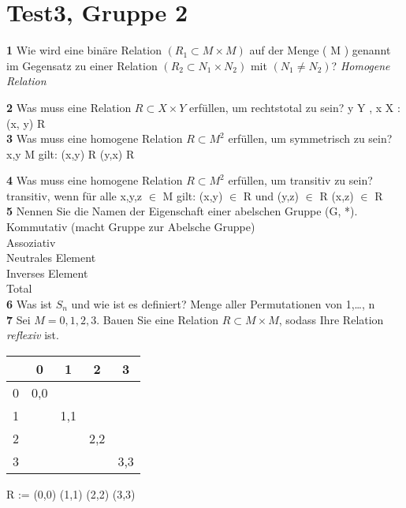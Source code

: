 \documentclass[11pt]{article}
\begin{document}
\section{Test3, Gruppe 2}
    \textbf{1} Wie wird eine binäre Relation $( R_1 \subset M \times M )$ auf der Menge ( M ) genannt im Gegensatz zu einer Relation $( R_2 \subset N_1 \times N_2 )$ mit $( N_1 \neq N_2 )$?\newline
    {\itshape Homogene Relation}\newline

    \textbf{2} Was muss eine Relation \( R \subset X \times Y \) erfüllen, um rechtstotal zu sein?\newline
    \forall y \in Y , \exists x \in X : (x, y) \in R\\

    \textbf{3} Was muss eine homogene Relation \( R \subset M^2 \) erfüllen, um symmetrisch zu sein?\newline
    \forall x,y \in M gilt: (x,y) \in R \rightarrow (y,x) \in R \newline

    \textbf{4} Was muss eine homogene Relation \( R \subset M^2 \) erfüllen, um transitiv zu sein?\\
    transitiv, wenn für alle x,y,z \(\in\) M gilt: (x,y) \(\in\) R und (y,z) \(\in\) R \rightarrow (x,z) \(\in\) R\\

    \textbf{5} Nennen Sie die Namen der Eigenschaft einer abelschen Gruppe (G, *).\newline
    Kommutativ (macht Gruppe zur Abelsche Gruppe)\\
    Assoziativ\\
    Neutrales Element\\
    Inverses Element\\
    Total\\

    \textbf{6} Was ist $S_n$ und wie ist es definiert?\newline
    Menge aller Permutationen von {1,\ldots, n}\\

    \textbf{7} Sei $M = {0,1,2,3}$. Bauen Sie eine Relation $R \subset M \times M$, sodass Ihre Relation {\itshape reflexiv} ist.\newline
\begin{tabular}{c|cccc}
    & 0 & 1 & 2 & 3 \\
    \hline
    0 & 0,0 & & & \\
    1 & & 1,1 & & \\
    2 & & & 2,2 & \\
    3 & & & & 3,3 \\
\end{tabular}\newline
R := {(0,0) (1,1) (2,2) (3,3)}\newline
\end{document}
